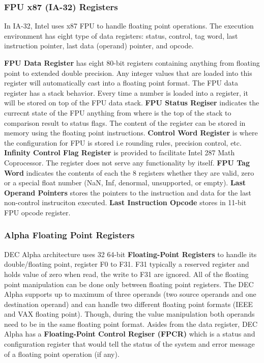\documentclass[letterpaper,10pt,titlepage]{article}
\begin{document}
{\subsubsection{FPU x87 (IA-32) Registers}
In IA-32, Intel uses x87 FPU to handle floating point operations. The
execution environment has eight type of data registers: status, control,
tag word, last instruction pointer, last data (operand) pointer, and opcode.
\par
\textbf{FPU Data Register} has eight 80-bit registers containing anything
from floating point to extended double precision. Any integer values that are
loaded into this register will automatically cast into a floating point 
format. The FPU data register has a stack behavior. Every time a number is
loaded into a register, it will be stored on top of the FPU data stack. 
\textbf{FPU Status Regiser} indicates the currecnt state of the FPU anything
from where is the top of the stack to comparison result to status flags.  
The content of the register can be stored in memory using the floating point
instructions. \textbf{Control Word Register} is where the configuration for 
FPU is stored i.e rounding rules, precision control, etc. \textbf{Infinity
Control Flag Register} is provided to facilitate Intel 287 Math Coprocessor. 
The register does not serve any functionality by itself. \textbf{FPU Tag Word}
indicates the contents of each the 8 registers whether they are valid, zero or 
a special float number (NaN, Inf, denormal, unsupported, or empty). \textbf{Last 
Operand Pointers} stores the pointers to the instruction and data for the last
non-control instruciton executed. \textbf{Last Instruction Opcode} stores in 
11-bit FPU opcode register. 

\subsubsection{Alpha Floating Point Registers}
DEC Alpha architecture uses 32 64-bit \textbf{Floating-Point Registers} to handle its 
double/floating point, register F0 to F31. F31 typically a reserved register
and holds value of zero when read, the write to F31 are ignored. All 
of the floating point manipulation can be done only between floating point 
registers. The DEC Alpha supports up to maximum of three operands
(two source operands and one destination operand) and can handle 
two different floating point formats (IEEE and VAX floating point). 
Though, during the value manipulation both operands need to be in the same
floating point format. Asides from the data register, DEC Alpha has a \textbf{Floating-Point 
Control Regiser (FPCR)} which is a status and configuration register that would
tell the status of the system and error message of a floating point operation (if any).
\par
}
\end{document}
